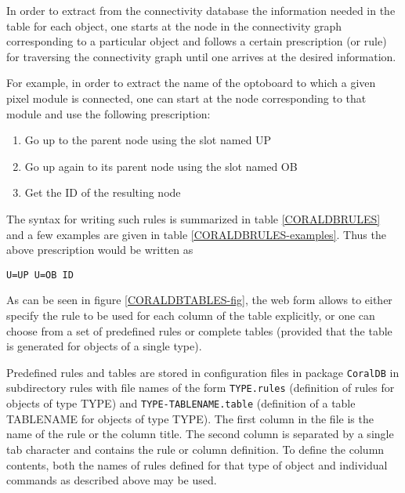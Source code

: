 In order to extract from the connectivity database the information
needed in the table for each object, one starts at the node in the
connectivity graph corresponding to a particular object and follows a certain
prescription (or rule) for traversing the connectivity graph until one
arrives at the desired information.

For example, in order to extract the name of the optoboard to which a
given pixel module is connected, one can start at the node
corresponding to that module and use the following prescription:

\begin{enumerate}
\item Go up to the parent node using the slot named UP
\item Go up again to its parent node using the slot named OB
\item Get the ID of the resulting node
\end{enumerate}

The syntax for writing such rules is summarized in table \ref{CORALDBRULES} and
a few examples are given in table \ref{CORALDBRULES-examples}.
Thus the above prescription would be written as
\begin{verbatim}
U=UP U=OB ID
\end{verbatim}

As can be seen in figure \ref{CORALDBTABLES-fig}, the web form allows to either specify
the rule to be used for each column of the table explicitly, or one
can choose from a set of predefined rules or complete tables (provided
that the table is generated for objects of a single type).

Predefined rules and tables are stored in configuration files in
package {\tt CoralDB} in subdirectory rules with file names of the form
{\tt TYPE.rules} (definition of rules for objects of type TYPE) and
{\tt TYPE-TABLENAME.table} (definition of a table TABLENAME for objects of
type TYPE). The first column in the file is the name of the rule or
the column title. The second column is separated by a single tab
character and contains the rule or column definition. To define
the column contents, both the names of rules defined for that type of
object and individual commands as described above may be used.


